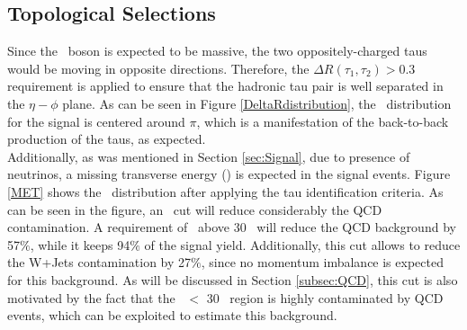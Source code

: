 
\subsection{Topological Selections}
\label{subsec:TopologicalSelections}


\noindent Since the \Zprime~boson is expected to 
be massive, the two oppositely-charged taus would be moving 
in opposite directions. Therefore, the $\Delta R (\tau_{1},\tau_{2}) > 0.3$
requirement is applied to ensure that the hadronic tau pair is well 
separated in the $\eta-\phi$ plane. As can be seen in Figure \ref{DeltaRdistribution},
the \DRt~distribution for the signal is centered around $\pi$, which is a manifestation of
the back-to-back production of the taus, as expected. \\


\noindent Additionally, as was mentioned in Section \ref{sec:Signal}, due to presence of neutrinos,
a missing transverse energy (\MET) is expected in the signal events. Figure \ref{MET}
shows the \MET~distribution after applying the tau identification criteria. As can be seen in the 
figure, an \MET~cut will reduce considerably the QCD contamination. A requirement of 
\MET~above 30 \GeV~will reduce the QCD background by 57$\%$, while it keeps
94$\%$ of the signal yield. Additionally, this cut allows to reduce the 
W+Jets contamination by 27$\%$, since no momentum imbalance is expected for 
this background. As will be discussed in Section \ref{subsec:QCD}, this cut 
is also motivated by the fact that the \MET~$<$ 30 \GeV~region is highly 
contaminated by QCD events, which can be exploited to estimate this background. \\

